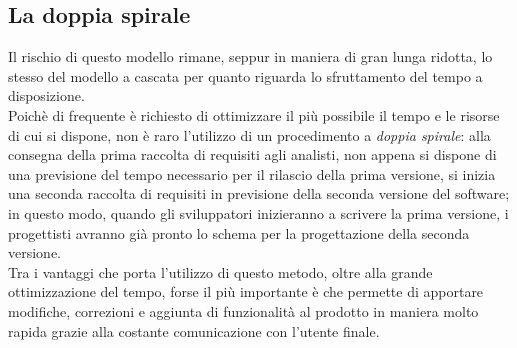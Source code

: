 \subsection{La doppia spirale}
Il rischio di questo modello rimane, seppur in maniera di gran lunga ridotta, lo stesso del modello a cascata per quanto riguarda lo sfruttamento del tempo a disposizione. \\
Poichè di frequente è richiesto di ottimizzare il più possibile il tempo e le risorse di cui si dispone, non è raro l'utilizzo di un procedimento a \textit{doppia spirale}: alla consegna della prima raccolta di requisiti agli analisti, non appena si dispone di una previsione del tempo necessario per il rilascio della prima versione, si inizia una seconda raccolta di requisiti in previsione della seconda versione del software; in questo modo, quando gli sviluppatori inizieranno a scrivere la prima versione, i progettisti avranno già pronto lo schema per la progettazione della seconda versione. \\
Tra i vantaggi che porta l'utilizzo di questo metodo, oltre alla grande ottimizzazione del tempo, forse il più importante è che permette di apportare modifiche, correzioni e aggiunta di funzionalità al prodotto in maniera molto rapida grazie alla costante comunicazione con l'utente finale.